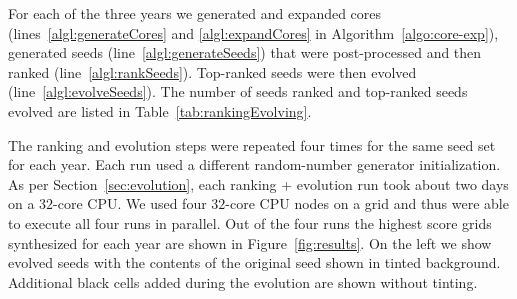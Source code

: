 For each of the three years we generated and expanded cores (lines~\ref{algl:generateCores} and \ref{algl:expandCores} in Algorithm~\ref{algo:core-exp}), generated seeds (line~\ref{algl:generateSeeds}) that were 
post-processed and then ranked (line~\ref{algl:rankSeeds}). Top-ranked seeds were then evolved (line~\ref{algl:evolveSeeds}). The number of seeds ranked and top-ranked seeds evolved are listed in Table~\ref{tab:rankingEvolving}.

The ranking and evolution steps were repeated four times for the same seed set for each year. Each run used a different random-number generator initialization. As per Section~\ref{sec:evolution}, each ranking + evolution run took about two days on a $32$-core CPU. We used four $32$-core CPU nodes on a grid and thus were able to execute all four runs in parallel. Out of the four runs the highest score grids synthesized for each year are shown in Figure~\ref{fig:results}. On the left we show evolved seeds with the contents of the original seed shown in tinted background. Additional black cells added during the evolution are shown without tinting.

